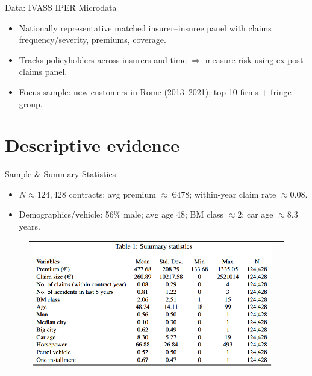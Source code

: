 \documentclass[10pt,aspectratio=169]{beamer}
\begin{document}
\begin{frame}{Data: IVASS IPER Microdata}
\justifying
\begin{itemize}
  \item Nationally representative matched insurer--insuree panel with claims frequency/severity, premiums, coverage.
  \item Tracks policyholders across insurers and time $\Rightarrow$ measure risk using ex-post claims panel.
  \item Focus sample: new customers in Rome (2013--2021); top 10 firms + fringe group.
\end{itemize}
\end{frame}

\section{Descriptive evidence}

\begin{frame}{Sample \& Summary Statistics}
\justifying
\begin{itemize}
  \item $N \approx 124{,}428$ contracts; avg premium $\approx \,€478$; within-year claim rate $\approx 0.08$.
  \item Demographics/vehicle: 56\% male; avg age 48; BM class $\approx 2$; car age $\approx 8.3$ years.
\end{itemize}
\begin{figure}[H]
\centering{}%
\begin{tabular}{cc}
\includegraphics[scale=0.41]{Figures/Tab1.png}
\end{tabular}
\end{figure}
\end{frame}
\end{document}
